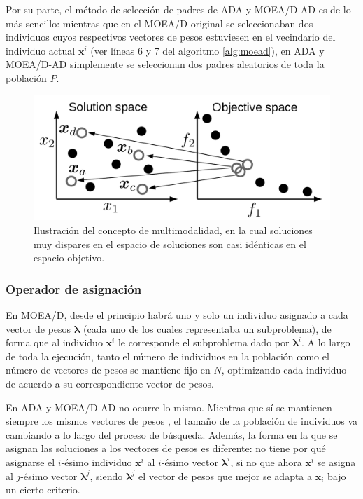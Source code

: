 Por su parte, el método de selección de padres de ADA y MOEA/D-AD es de lo más sencillo: mientras que en el MOEA/D original se seleccionaban dos individuos cuyos respectivos vectores de pesos estuviesen en el vecindario del individuo actual $\textbf{x}^i$ (ver líneas 6 y 7 del algoritmo \ref{alg:moead}), en ADA y MOEA/D-AD simplemente se seleccionan dos padres aleatorios de toda la población $P$.

\begin{figure}
	\centering
	\includegraphics[width=1.0\textwidth]{Images/multimodal}
	\caption[Ilustración del concepto de multimodalidad, en la cual soluciones muy dispares en el espacio de soluciones son casi idénticas en el espacio objetivo.]{Ilustración del concepto de multimodalidad, en la cual soluciones muy dispares en el espacio de soluciones son casi idénticas en el espacio objetivo.\cite{tanabe2019framework}}
	\label{fig:multimodal}
\end{figure}

\subsubsection{Operador de asignación}

En MOEA/D, desde el principio habrá uno y solo un individuo asignado a cada vector de pesos $\boldsymbol\lambda$ (cada uno de los cuales representaba un subproblema), de forma que al individuo $\textbf{x}^i$ le corresponde el subproblema dado por $\boldsymbol\lambda^i$. A lo largo de toda la ejecución, tanto el número de individuos en la población como el número de vectores de pesos se mantiene fijo en $N$, optimizando cada individuo de acuerdo a su correspondiente vector de pesos.

En ADA y MOEA/D-AD no ocurre lo mismo. Mientras que sí se mantienen siempre los mismos vectores de pesos , el tamaño de la población de individuos va cambiando a lo largo del proceso de búsqueda. Además, la forma en la que se asignan las soluciones a los vectores de pesos es diferente: no tiene por qué asignarse el $i$-ésimo individuo $\textbf{x}^i$ al $i$-ésimo vector $\boldsymbol\lambda^i$, si no que ahora $\textbf{x}^i$ se asigna al $j$-ésimo vector $\boldsymbol\lambda^j$, siendo $\boldsymbol\lambda^j$ el vector de pesos que mejor se adapta a $\textbf{x}_i$  bajo un cierto criterio.

